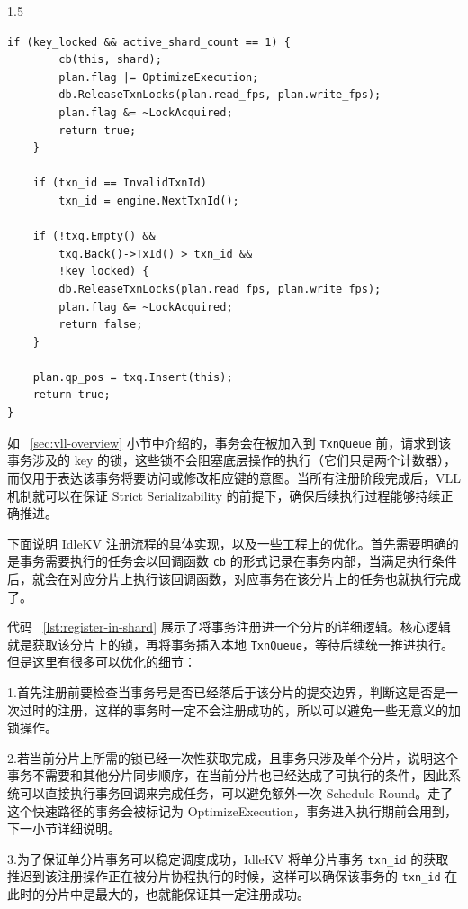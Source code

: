 \documentclass[a4paper,12pt,fontset=none,twoside]{article}
\numberwithin{figure}{section}
\numberwithin{equation}{section}
\numberwithin{table}{section}
\begin{document}
\begin{spacing}{1.5}
\begin{listing}[!htb]
\begin{minipage}{0.82\textwidth}
\begin{lstlisting}[style=idlecpp]
    if (key_locked && active_shard_count == 1) {
        cb(this, shard);
        plan.flag |= OptimizeExecution;
        db.ReleaseTxnLocks(plan.read_fps, plan.write_fps);
        plan.flag &= ~LockAcquired;
        return true;
    }

    if (txn_id == InvalidTxnId)
        txn_id = engine.NextTxnId();

    if (!txq.Empty() &&
        txq.Back()->TxId() > txn_id &&
        !key_locked) {
        db.ReleaseTxnLocks(plan.read_fps, plan.write_fps);
        plan.flag &= ~LockAcquired;
        return false;
    }

    plan.qp_pos = txq.Insert(this);
    return true;
}
	\end{lstlisting}
	\end{minipage}
	\caption{\texttt{RegisterInShard()} 的本地注册逻辑}
	\label{lst:register-in-shard}
	\end{listing}

	如 ~\ref{sec:vll-overview} 小节中介绍的，事务会在被加入到 \texttt{TxnQueue} 前，请求到该事务涉及的 key 的锁，这些锁不会阻塞底层操作的执行（它们只是两个计数器），而仅用于表达该事务将要访问或修改相应键的意图。当所有注册阶段完成后，VLL 机制就可以在保证 Strict Serializability 的前提下，确保后续执行过程能够持续正确推进。

	下面说明 IdleKV 注册流程的具体实现，以及一些工程上的优化。首先需要明确的是事务需要执行的任务会以回调函数 \texttt{cb}  的形式记录在事务内部，当满足执行条件后，就会在对应分片上执行该回调函数，对应事务在该分片上的任务也就执行完成了。

	代码 ~\ref{lst:register-in-shard} 展示了将事务注册进一个分片的详细逻辑。核心逻辑就是获取该分片上的锁，再将事务插入本地 \texttt{TxnQueue}，等待后续统一推进执行。但是这里有很多可以优化的细节：

	1.首先注册前要检查当事务号是否已经落后于该分片的提交边界，判断这是否是一次过时的注册，这样的事务时一定不会注册成功的，所以可以避免一些无意义的加锁操作。
	
	2.若当前分片上所需的锁已经一次性获取完成，且事务只涉及单个分片，说明这个事务不需要和其他分片同步顺序，在当前分片也已经达成了可执行的条件，因此系统可以直接执行事务回调来完成任务，可以避免额外一次 Schedule Round。走了这个快速路径的事务会被标记为 OptimizeExecution，事务进入执行期前会用到，下一小节详细说明。
	
	3.为了保证单分片事务可以稳定调度成功，IdleKV 将单分片事务 \texttt{txn\_id} 的获取推迟到该注册操作正在被分片协程执行的时候，这样可以确保该事务的 \texttt{txn\_id} 在此时的分片中是最大的，也就能保证其一定注册成功。
	


\end{spacing}
\end{document}
